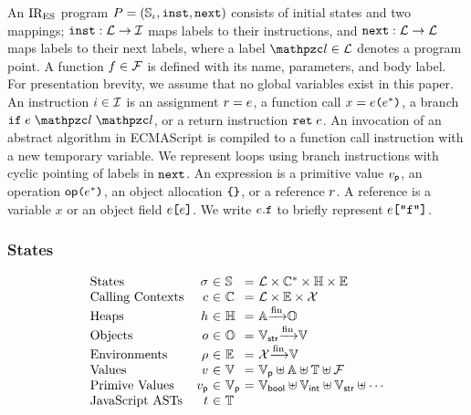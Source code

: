 An $\text{IR}_\text{ES}$ program $P = (\mathbb{S}_\iota, \texttt{inst}, \texttt{next})$ consists of initial
states and two mappings; $\texttt{inst}: \mathcal{L} \rightarrow \mathcal{I}$ maps labels to
their instructions, and $\texttt{next}: \mathcal{L} \rightarrow \mathcal{L}$ maps labels to
their next labels, where a label $\lab \in \labset$ denotes a program point.  A
function $f \in \mathcal{F}$ is defined with its name, parameters, and body
label.  For presentation brevity, we assume that no global variables exist in
this paper.  An instruction $i \in \mathcal{I}$ is an assignment $r =
e$, a function call $x = e \texttt{(} e^* \texttt{)}$, a branch $\kwif \;
\expr \; \lab \; \lab$, or a return instruction $\texttt{ret} \; e$.  An
invocation of an abstract algorithm in ECMAScript is compiled to a function call
instruction with a new temporary variable.  We represent loops using branch
instructions with cyclic pointing of labels in $\texttt{next}$.  An expression is a
primitive value $v_{\textsf{p}}$, an operation $\textsf{op} \texttt{(} e^* \texttt{)}$, an object
allocation $\texttt{\{} \texttt{\}}$, or a reference $r$.  A reference is a variable
$x$ or an object field $e \texttt{[} e \texttt{]}$.  We write $e.\texttt{f}$ to
briefly represent $e \texttt{[} \texttt{"f"} \texttt{]}$.


\subsubsection{States}

\[
  \begin{array}{lr@{~}c@{~}l@{~}c@{~}l}
    \text{States} & \st &\in& \stset &=&
    \labset \times \ctxtset^* \times \heapset \times \envset\\

    \text{Calling Contexts} & \ctxt &\in& \ctxtset &=&
    \labset \times \envset \times \varset\\

    \text{Heaps} & \heap &\in& \heapset &=&
    \addrset \finmap \objset\\

    \text{Objects} & \obj &\in& \objset &=&
    \strset \finmap \valset\\

    \text{Environments} & \env &\in& \envset &=&
    \varset \finmap \valset\\

    \text{Values} & \val &\in& \valset &=&
    \pvalset \uplus \addrset \uplus \treeset \uplus \funcset\\

    \text{Primive Values} & \pval &\in& \pvalset &=&
    \boolset \uplus \intset \uplus \strset \uplus \cdots\\

    \text{JavaScript ASTs} & \tree &\in& \treeset\\
  \end{array}
\]

